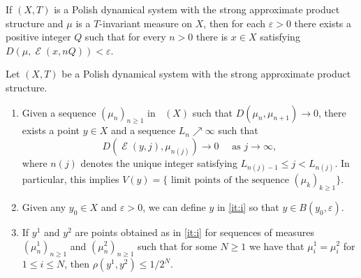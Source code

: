 \documentclass[10pt,a4paper]{amsart}
\DeclareMathOperator{\Emp}{\mathcal{E}}%
\DeclareMathOperator{\MT}{\mathcal{M}_{\mathit T} }
\newcommand{\eps}{\varepsilon}
\begin{document}
\begin{lem}\label{lem:protogen}
If $(X,T)$ is a Polish dynamical system with the strong approximate
product structure and $\mu$ is a $T$-invariant measure on $X$, then
for each $\eps>0$ there exists a positive integer $Q$ such that for every $n>0$
there is $x\in X$ satisfying $D(\mu,\Emp(x,nQ))<\eps$.
\end{lem}

\begin{lem} \label{lem:main}
Let $(X, T)$ be a Polish dynamical system with the strong approximate product structure.
\begin{enumerate}
\item \label{it:i} Given a sequence $(\mu_n)_{n \geq 1}$ in $\MT(X)$ such that $D(\mu_n, \mu_{n+1}) \to 0$, there exists a point $y \in X$ and a sequence $L_n \nearrow \infty$ such that
\begin{equation} \label{eqn:lemmain}
D(\Emp(y, j), \mu_{n(j)}) \to 0 \quad \textrm{ as } j \to \infty,
\end{equation}
where $n(j)$ denotes the unique integer satisfying $L_{n(j) - 1} \le j < L_{n(j)}$. In particular, this implies $V(y) = \{ \textrm{ limit points of the sequence } (\mu_k)_{k \geq 1} \}$.
\item \label{it:ii} Given any $y_0 \in X$ and $\eps > 0$, we can define $y$ in \eqref{it:i} so that $y \in B(y_0, \eps)$.
\item \label{it:iii} If $y^{1}$ and $y^{2}$ are points obtained as in \eqref{it:i}  for sequences of measures $( \mu^{1}_n ) _{n \ge 1}$ and $( \mu^{2}_n ) _{n \ge 1}$ such that for some $N\ge 1$ we have that $\mu^{1}_i = \mu^{2}_i$ for $1\le i \le N$,  then $\rho(y^{1}, y^{2}) \le 1 / 2^N$.
\end{enumerate}
\end{lem}
\end{document}
